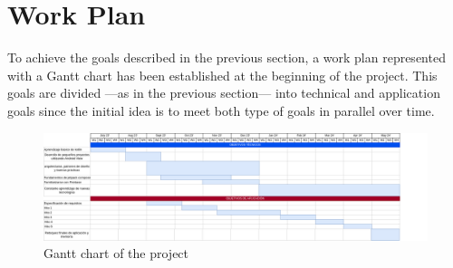 \section*{Work Plan}
To achieve the goals described in the previous section, a work plan represented with a Gantt chart has been established at the beginning of the project. This goals are divided —as in the previous section— into technical and application goals since the initial idea is to meet both type of goals in parallel over time.
\begin{figure}[h]
	\centering
	\includegraphics[width = 1\textwidth]{Imagenes/Bitmap/Gantt_Diagram.png}
	\caption{Gantt chart of the project}
	\label{fig:Gantt}
\end{figure}

